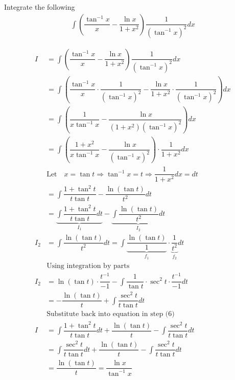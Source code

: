 



\question[5] Integrate the following
\begin{align}
    \int \left(\dfrac{\tan^{-1}x}{x}-\dfrac{\ln x}{1+x^2}\right)\dfrac{1}{(\tan^{-1}x)^2}dx \nonumber
\end{align}


\begin{solution}[\fullpage]
  \begin{align}
    I &= \int \left(\dfrac{\tan^{-1}x}{x}-\dfrac{\ln x}{1+x^2}\right)\dfrac{1}{(\tan^{-1}x)^2}dx \\
      &= \int \left(\dfrac{\tan^{-1}x}{x}\cdot\dfrac{1}{(\tan^{-1}x)^2}-
                    \dfrac{\ln x}{1+x^2}\cdot\dfrac{1}{(\tan^{-1}x)^2}\right)dx \\
      &= \int \left(\dfrac{1}{x\tan^{-1}x}-\dfrac{\ln x}{(1+x^2)(\tan^{-1}x)^2}\right)dx \\
      &= \int \left(\dfrac{1+x^2}{x\tan^{-1}x}-\dfrac{\ln x}{(\tan^{-1}x)^2}\right)
              \cdot\dfrac{1}{1+x^2}dx \\
      &\text{Let}\quad x=\tan t\Rightarrow\tan^{-1}x=t\Rightarrow \dfrac{1}{1+x^2}dx=dt \nonumber \\
      &= \int \dfrac{1+\tan^2 t}{t\tan t}-\dfrac{\ln (\tan t)}{t^2}dt \\
      &= \underbrace{\int\dfrac{1+\tan^2 t}{t\tan t}dt}_{I_1}-
         \underbrace{\int\dfrac{\ln (\tan t)}{t^2}dt}_{I_2} \\
    I_2 &= \int\dfrac{\ln (\tan t)}{t^2}dt 
         = \int\underbrace{\dfrac{\ln (\tan t)}{1}}_{f_1}\cdot\underbrace{\dfrac{1}{t^2}}_{f_2}dt \\
        &\text{Using integration by parts} \nonumber \\
    I_2 &= \ln(\tan t)\cdot\dfrac{t^{-1}}{-1} - 
           \int \dfrac{1}{\tan t}\cdot\sec^{2}t\cdot\dfrac{t^{-1}}{-1}dt \\
        &= -\dfrac{\ln(\tan t)}{t} + \int \dfrac{\sec^{2}t}{t\tan t}dt \\
        &\text{Substitute back into equation in step (6)} \nonumber \\
    I &= \int\dfrac{1+\tan^2 t}{t\tan t}dt + \dfrac{\ln(\tan t)}{t} - \int \dfrac{\sec^{2}t}{t\tan t}dt \\
      &= \int\dfrac{\sec^2 t}{t\tan t}dt + \dfrac{\ln(\tan t)}{t} - \int \dfrac{\sec^{2}t}{t\tan t}dt \\
      &= \dfrac{\ln(\tan t)}{t} = \dfrac{\ln x}{\tan^{-1}x}
  \end{align}
\end{solution}
